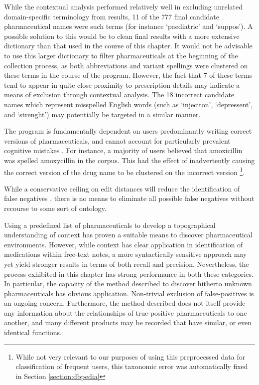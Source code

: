 While the contextual analysis performed relatively well in excluding unrelated domain-specific terminology from results, 11 of the 777 final candidate pharmaceutical names were such terms (for instance `paediatric' and `suppos'). A possible solution to this would be to clean final results with a more extensive dictionary than that used in the course of this chapter. It would not be advisable to use this larger dictionary to filter pharmaceuticals at the beginning of the collection process, as both abbreviations and variant spellings were clustered on these terms in the course of the program. However, the fact that 7 of these terms tend to appear in quite close proximity to prescription details may indicate a means of exclusion through contextual analysis. The 18 incorrect candidate names which represent misspelled English words (such as `injeciton', `depressent', and `strenght') may potentially be targeted in a similar manner.

The program is fundamentally dependent on users predominantly writing correct versions of pharmaceuticals, and cannot account for particularly prevalent cognitive mistakes \cite{sessions2006effects}. For instance, a majority of users believed that amoxicillin was spelled amoxycillin in the corpus. This had the effect of inadvertently causing the correct version of the drug name to be clustered on the incorrect version \footnote{While not very relevant to our purposes of using this preprocessed data for classification of frequent users, this taxonomic error was automatically fixed in Section \ref{section:dbpedia}}. 


While a conservative ceiling on edit distances will reduce the identification of false negatives \cite{jupin2012understanding}, there is no means to eliminate all possible false negatives without recourse to some sort of ontology.

Using a predefined list of pharmaceuticals to develop a topographical understanding of context has proven a suitable means to discover pharmaceutical environments. However, while context has clear application in identification of medications within free-text notes, a more syntactically sensitive approach may yet yield stronger results in terms of both recall and precision. Nevertheless, the process exhibited in this chapter has strong performance in both these categories. In particular, the capacity of the method described to discover hitherto unknown pharmaceuticals has obvious application. Non-trivial exclusion of false-positives is an ongoing concern. Furthermore, the method described does not itself provide any information about the relationships of true-positive pharmaceuticals to one another, and many different products may be recorded that have similar, or even identical functions.     



